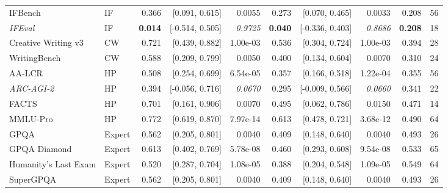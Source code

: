 \begin{tabular}{llrrrrrrrr}
IFBench & IF & 0.366 & [0.091, 0.615] & 0.0055 & 0.273 & [0.070, 0.465] & 0.0033 & 0.208 & 56 \\
\itshape IFEval & IF & \bfseries 0.014 & [-0.514, 0.505] & \itshape 0.9725 & \bfseries 0.040 & [-0.336, 0.403] & \itshape 0.8686 & \bfseries 0.208 & 18 \\
Creative Writing v3 & CW & 0.721 & [0.439, 0.882] & 1.00e-03 & 0.536 & [0.304, 0.724] & 1.00e-03 & 0.394 & 28 \\
WritingBench & CW & 0.588 & [0.209, 0.799] & 0.0050 & 0.400 & [0.134, 0.604] & 0.0070 & 0.310 & 24 \\
AA-LCR & HP & 0.508 & [0.254, 0.699] & 6.54e-05 & 0.357 & [0.166, 0.518] & 1.22e-04 & 0.355 & 56 \\
\itshape ARC-AGI-2 & HP & 0.394 & [-0.056, 0.716] & \itshape 0.0670 & 0.295 & [-0.009, 0.566] & \itshape 0.0660 & 0.341 & 22 \\
FACTS & HP & 0.701 & [0.161, 0.906] & 0.0070 & 0.495 & [0.062, 0.786] & 0.0150 & 0.471 & 14 \\
MMLU-Pro & HP & 0.772 & [0.619, 0.870] & 7.97e-14 & 0.613 & [0.478, 0.721] & 3.68e-12 & 0.490 & 64 \\
GPQA & Expert & 0.562 & [0.205, 0.801] & 0.0040 & 0.409 & [0.148, 0.640] & 0.0040 & 0.493 & 26 \\
GPQA Diamond & Expert & 0.613 & [0.402, 0.769] & 5.78e-08 & 0.460 & [0.293, 0.608] & 9.54e-08 & 0.533 & 65 \\
Humanity's Last Exam & Expert & 0.520 & [0.287, 0.704] & 1.08e-05 & 0.388 & [0.204, 0.548] & 1.09e-05 & 0.549 & 64 \\
SuperGPQA & Expert & 0.562 & [0.205, 0.801] & 0.0040 & 0.409 & [0.148, 0.640] & 0.0040 & 0.493 & 26 \\
\bottomrule
\end{tabular}
